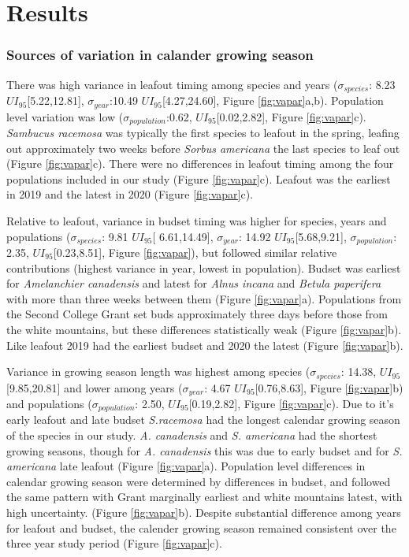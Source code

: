 \documentclass[12 pt]{article}
\begin{document}
\section{Results} %
\subsubsection{Sources of variation in calander growing season}
There was high variance in leafout timing among species and years ($\sigma_{species}$: 8.23 $UI_{95}$[5.22,12.81], $\sigma_{year}$:10.49 $UI_{95}$[4.27,24.60], Figure \ref{fig:vapar}a,b). Population level variation was low ($\sigma_{population}$:0.62, $UI_{95}$[0.02,2.82], Figure \ref{fig:vapar}c). \emph{Sambucus racemosa} was typically the first species to leafout in the spring, leafing out approximately two weeks before \emph{Sorbus americana} the last species to leaf out (Figure \ref{fig:vapar}c). There were no differences in leafout timing among the four populations included in our study (Figure \ref{fig:vapar}c). Leafout was the earliest in 2019 and the latest in 2020 (Figure \ref{fig:vapar}c). 

Relative to leafout, variance in budset timing was higher for species, years and populations ($\sigma_{species}$: 9.81 $UI_{95}$[ 6.61,14.49], $\sigma_{year}$: 14.92 $UI_{95}$[5.68,9.21], $\sigma_{population}$: 2.35, $UI_{95}$[0.23,8.51], Figure \ref{fig:vapar}), but followed similar relative contributions (highest variance in year, lowest in population).
Budset was earliest for \emph{Amelanchier canadensis} and latest for \emph{Alnus incana} and \emph{Betula paperifera} with more than three weeks between them (Figure \ref{fig:vapar}a). Populations from the Second College Grant set buds approximately three days before those from the white mountains, but these differences statistically weak (Figure \ref{fig:vapar}b). Like leafout 2019 had the earliest budset and 2020 the latest (Figure \ref{fig:vapar}b).

Variance in growing season length was highest among species ($\sigma_{species}$: 14.38, $UI_{95}$[9.85,20.81] and lower among years ($\sigma_{year}$: 4.67 $UI_{95}$[0.76,8.63], Figure \ref{fig:vapar}b) and populations ($\sigma_{population}$: 2.50, $UI_{95}$[0.19,2.82], Figure \ref{fig:vapar}c). Due to it's early leafout and late budset \emph{S.racemosa} had the longest calendar growing season of the species in our study. \emph{A. canadensis} and \emph{S. americana} had the shortest growing seasons, though for \emph{A. canadensis} this was due to early budset and for \emph{S. americana} late leafout (Figure \ref{fig:vapar}a). Population level differences in calendar growing season were determined by differences in budset, and followed the same pattern with Grant marginally earliest and white mountains  latest, with high uncertainty. (Figure \ref{fig:vapar}b). Despite substantial difference among years for leafout and budset, the calender growing season remained consistent over the three year study period (Figure \ref{fig:vapar}c).
\end{document}
